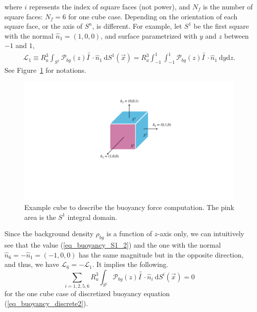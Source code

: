 where $i$ represents the index of square faces (not power), and $N_f$ is the number of square faces: $N_f = 6$ for one cube case. Depending on the orientation of each square face, or the axis of $S^n$, is different. For example, let $S^1$ be the first square with the normal $\hat{n}_1 = (1,0,0)$, and surface parametrized with $y$ and $z$ between $-1$ and $1$,
\begin{align}
	\mathcal{L}_1 \equiv 
	R_a^3 
	 \int_{S^1}
	 \mathcal{P}_{bg}(z) 
	  \bar{\bar{I \ }}  \cdot
	\hat{n}_1 \ \textrm{d}S^1 (\vec{x})
	= R_a^3  \int_{-1}^{1} \int_{-1}^{1}
	\mathcal{P}_{bg}(z) 
	\bar{\bar{I \ }}  \cdot
 	\hat{n}_1 \ 
	\textrm{d}y  \textrm{d}z.
\label{eq_buoyancy_S1_2}
\end{align}
See Figure~\ref{fig_rho_bg_on_S1} for notations.
\begin{figure}[h]
	\begin{center}
		\includegraphics[scale=0.3]{./figures/fig_rho_bg_on_S1.pdf}
	\caption{Example cube to describe the buoyancy force computation. The pink area is the $S^1$ integral domain.}
	\label{fig_rho_bg_on_S1}
\end{center}
\end{figure}
Since the background density $\rho_{bg}$ is a function of $z$-axis only, we can intuitively see that the value (\ref{eq_buoyancy_S1_2}) and the one with the normal $\hat{n}_6 = -\hat{n}_1 = (-1,0,0)$ has the same magnitude but in the opposite direction, and thus, we have $\mathcal{L}_6 = -\mathcal{L}_1$. 
It implies the following.
\begin{equation}
	\sum_{i=1,2,5,6}
	 R_a^3 \int_{S^i} 
	 \mathcal{P}_{bg}(z) 
	 \bar{\bar{I \ }}  \cdot
	\hat{n}_i \ \textrm{d}S^i (\vec{x})
	 = 0
\label{eq_buoyancy_zero_oneCube}
\end{equation}
for the one cube case of discretized buoyancy equation (\ref{eq_buoyancy_discrete2}).
